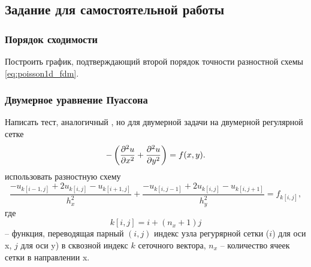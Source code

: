 \clearpage
\subsection{Задание для самостоятельной работы}

\subsubsection{Порядок сходимости}

Построить график, подтверждающий второй порядок точности
разностной схемы \eqref{eq:poisson1d_fdm}.

\subsubsection{Двумерное уравнение Пуассона}

Написать тест, аналогичный \cvar{[poisson1]}, но
для двумерной задачи на двумерной регулярной сетке
\begin{equation*}
   -\left(\frac{\partial^2 u}{\partial x^2} + \frac{\partial^2 u}{\partial y^2}\right) = f(x, y).
\end{equation*}
использовать разностную схему
\begin{equation*}
   \frac{-u_{k[i-1,j]} + 2 u_{k[i, j]} - u_{k[i+1,j]}}{h_x^2} +
   \frac{-u_{k[i,j-1]} + 2 u_{k[i, j]} - u_{k[i,j+1]}}{h_y^2} =
   f_{k[i,j]},
\end{equation*}
где
\begin{equation}
    \label{eq:tasks_ij2k}
    k[i, j] = i + (n_x+1) j
\end{equation}
-- функция, переводящая парный $(i,j)$ индекс узла регурярной сетки ($i$) для оси x, $j$ для оси y) в сквозной индекс $k$
сеточного вектора, $n_x$ -- количество ячеек сетки в направлении x.

